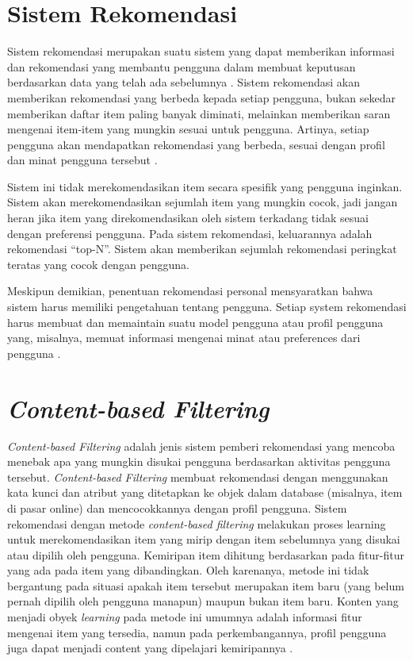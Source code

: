 \section{Sistem Rekomendasi}
Sistem rekomendasi merupakan suatu sistem yang dapat memberikan informasi dan rekomendasi yang membantu pengguna dalam membuat keputusan berdasarkan data yang telah ada sebelumnya
\citep{clustering}. Sistem rekomendasi akan memberikan rekomendasi yang berbeda kepada setiap pengguna, bukan sekedar memberikan daftar item paling banyak diminati, melainkan memberikan
saran mengenai item-item yang mungkin sesuai untuk pengguna. Artinya, setiap pengguna akan mendapatkan rekomendasi yang berbeda, sesuai dengan profil dan minat
pengguna tersebut \citep{contentBasedXCollaborative}.

Sistem ini tidak merekomendasikan item secara spesifik yang pengguna inginkan. Sistem akan merekomendasikan sejumlah item yang mungkin cocok, jadi jangan heran jika
item yang direkomendasikan oleh sistem terkadang tidak sesuai dengan preferensi pengguna. Pada sistem rekomendasi, keluarannya adalah rekomendasi “top-N”. Sistem akan memberikan sejumlah
rekomendasi peringkat teratas yang cocok dengan pengguna.

Meskipun demikian, penentuan rekomendasi personal mensyaratkan bahwa sistem harus memiliki pengetahuan tentang pengguna. Setiap system rekomendasi harus membuat dan
memaintain suatu model pengguna atau profil pengguna yang, misalnya, memuat informasi mengenai minat atau preferences dari pengguna \citep{contentBasedXCollaborative}.

\section{\emph{Content-based Filtering}}
\emph{Content-based Filtering} adalah jenis sistem pemberi rekomendasi yang mencoba menebak apa yang mungkin disukai pengguna berdasarkan aktivitas pengguna tersebut. \emph{Content-based Filtering}
membuat rekomendasi dengan menggunakan kata kunci dan atribut yang ditetapkan ke objek dalam database (misalnya, item di pasar online) dan mencocokkannya dengan profil pengguna.
Sistem rekomendasi dengan metode \emph{content-based filtering} melakukan proses learning untuk merekomendasikan item yang mirip dengan item sebelumnya
yang disukai atau dipilih oleh pengguna. Kemiripan item dihitung berdasarkan pada fitur-fitur yang ada pada item yang dibandingkan. Oleh karenanya, metode ini tidak bergantung
pada situasi apakah item tersebut merupakan item baru {(yang belum pernah dipilih oleh pengguna manapun)} maupun bukan item baru. Konten yang menjadi obyek \emph{learning} pada
metode ini umumnya adalah informasi fitur mengenai item yang tersedia, namun pada perkembangannya, profil pengguna juga dapat menjadi content yang dipelajari
kemiripannya \citep{contentBasedXCollaborative}.

